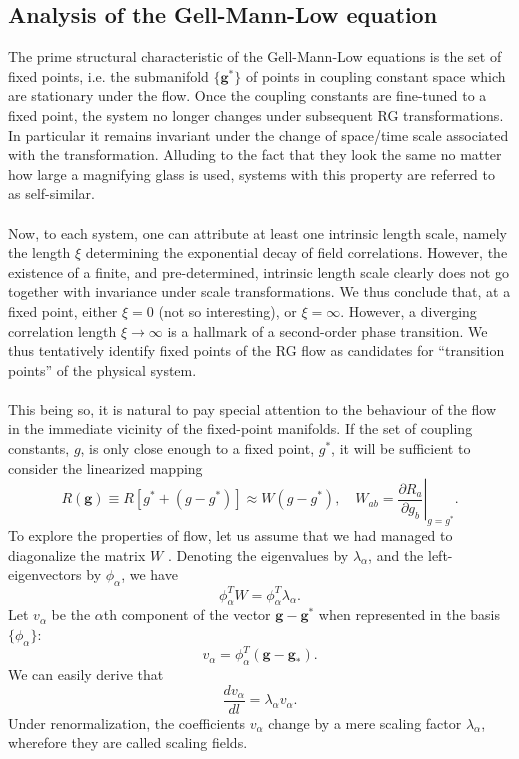 \subsection{Analysis of the Gell-Mann-Low equation}
The prime structural characteristic of the Gell-Mann-Low equations is the set of fixed points, i.e. the submanifold $\{\bm{g}^*\}$ of points in coupling constant space which are stationary under the flow. 
Once the coupling constants are fine-tuned to a fixed point, the system no longer changes under subsequent RG transformations. In particular it remains invariant under the change of space/time scale associated with the transformation.
Alluding to the fact that they look the same no matter how large a magnifying glass is used, systems with this property are referred to as self-similar.
\\ \\
Now, to each system, one can attribute at least one intrinsic length scale, namely the length $\xi$ determining the exponential decay of field correlations. 
However, the existence of a finite, and pre-determined, intrinsic length scale clearly does not go together with invariance under scale transformations. We thus conclude that, at a fixed point, either $\xi = 0$ (not so interesting), or $\xi = \infty$. 
However, a diverging correlation length $\xi \to \infty$ is a hallmark of a second-order phase transition. We thus tentatively identify fixed points of the RG flow as candidates for ``transition points'' of the physical system.
\\ \\
This being so, it is natural to pay special attention to
the behaviour of the flow in the immediate vicinity of the fixed-point manifolds. If the set of coupling constants, $g$, is only close enough to a fixed point, $g^*$, it will be sufficient to consider the linearized mapping
\[R(\bm{g}) \equiv R[g^*+(g-g^*)] \approx W(g-g^*) , \quad W_{ab} = \left. \frac{\partial R_a}{\partial g_b} \right|_{g=g^*}.\]
To explore the properties of flow, let us assume that we had managed to diagonalize the matrix $W$ . Denoting the eigenvalues by $\lambda_{\alpha}$, and the left-eigenvectors by $\phi_{\alpha}$, we have
\[\phi_{\alpha}^T W = \phi_{\alpha}^T\lambda_{\alpha}.\]
Let $v_{\alpha}$ be the $\alpha$th component of the vector $\bm{g} - \bm{g}^*$ when represented in the basis $\{\phi_{\alpha}\}$:
\[v_{\alpha} = \phi_{\alpha}^T (\bm{g}-\bm{g}_{*}).\]
We can easily derive that
\[\frac{dv_{\alpha}}{dl} = \lambda_{\alpha}v_{\alpha}.\]
Under renormalization, the coefficients $v_{\alpha}$ change by a mere scaling factor $\lambda_{\alpha}$, wherefore they are called scaling fields.
